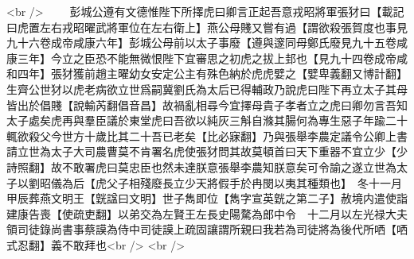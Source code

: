 <br />
　　彭城公遵有文德惟陛下所擇虎曰卿言正起吾意戎昭將軍張犲曰【載記曰虎置左右戎昭曜武將軍位在左右衛上】燕公母賤又嘗有過【謂欲殺張賀度也事見九十六卷成帝咸康六年】彭城公母前以太子事廢【遵與邃同母鄭氏廢見九十五卷咸康三年】今立之臣恐不能無微恨陛下宜審思之初虎之拔上邽也【見九十四卷成帝咸和四年】張犲獲前趙主曜幼女安定公主有殊色納於虎虎嬖之【嬖卑義翻又博計翻】生齊公世犲以虎老病欲立世爲嗣冀劉氏為太后已得輔政乃說虎曰陛下再立太子其母皆出於倡賤【說輸芮翻倡音昌】故禍亂相尋今宜擇母貴子孝者立之虎曰卿勿言吾知太子處矣虎再與羣臣議於東堂虎曰吾欲以純灰三斛自滌其腸何為專生惡子年踰二十輒欲殺父今世方十歲比其二十吾已老矣【比必寐翻】乃與張舉李農定議令公卿上書請立世為太子大司農曹莫不肯署名虎使張犲問其故莫頓首曰天下重器不宜立少【少詩照翻】故不敢署虎曰莫忠臣也然未達朕意張舉李農知朕意矣可令諭之遂立世為太子以劉昭儀為后【虎父子相殘廢長立少天將假手於冉閔以夷其種類也】　冬十一月甲辰葬燕文明王【皝諡曰文明】世子雋即位【雋字宣英皝之第二子】赦境内遣使詣建康告喪【使疏吏翻】以弟交為左賢王左長史陽騖為郎中令　十二月以左光禄大夫領司徒錄尚書事蔡謨為侍中司徒謨上疏固讓謂所親曰我若為司徒將為後代所哂【哂式忍翻】義不敢拜也<br />
<br />

